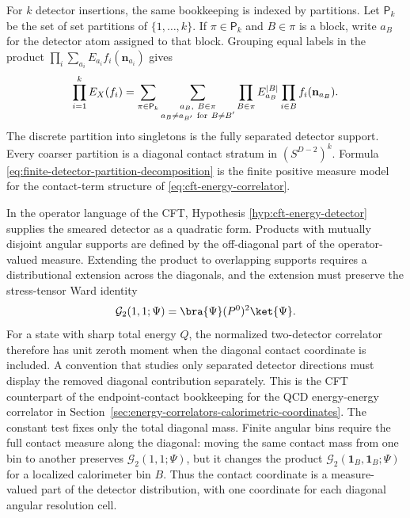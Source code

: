 For \(k\) detector insertions, the same bookkeeping is indexed by partitions.
Let \(\mathsf P_k\) be the set of set partitions of \(\{1,\ldots,k\}\).  If
\(\pi\in\mathsf P_k\) and \(B\in\pi\) is a block, write \(a_B\) for the
detector atom assigned to that block.  Grouping equal labels in the product
\(\prod_i\sum_{a_i}E_{a_i}f_i(\mathbf n_{a_i})\) gives
\begin{equation}
  \prod_{i=1}^k E_X(f_i)
  =
  \sum_{\pi\in\mathsf P_k}
  \sum_{\substack{a_B,\ B\in\pi\\ a_B\neq a_{B'}\ {\rm for}\ B\neq B'}}
  \prod_{B\in\pi}
  E_{a_B}^{|B|}
  \prod_{i\in B} f_i(\mathbf n_{a_B}).
  \label{eq:finite-detector-partition-decomposition}
\end{equation}
The discrete partition into singletons is the fully separated detector
support.  Every coarser partition is a diagonal contact stratum in
\((S^{D-2})^k\).  Formula
\eqref{eq:finite-detector-partition-decomposition} is the finite positive
measure model for the contact-term structure of
\eqref{eq:cft-energy-correlator}.

In the operator language of the CFT, Hypothesis
\ref{hyp:cft-energy-detector} supplies the smeared detector as a quadratic
form.  Products with mutually disjoint angular supports are defined by the
off-diagonal part of the operator-valued measure.  Extending the product to
overlapping supports requires a distributional extension across the
diagonals, and the extension must preserve the stress-tensor Ward identity
\begin{equation}
  \mathcal G_2(1,1;\Psi)
  =
  \bra{\Psi}(P^0)^2\ket{\Psi}.
  \label{eq:detector-product-total-energy-ward}
\end{equation}
For a state with sharp total energy \(Q\), the normalized two-detector
correlator therefore has unit zeroth moment when the diagonal contact
coordinate is included.  A convention that studies only separated detector
directions must display the removed diagonal contribution separately.  This is
the CFT counterpart of the endpoint-contact bookkeeping for the QCD
energy-energy correlator in
Section~\ref{sec:energy-correlators-calorimetric-coordinates}.
The constant test fixes only the total diagonal mass.  Finite angular bins
require the full contact measure along the diagonal: moving the same contact
mass from one bin to another preserves
\(\mathcal G_2(1,1;\Psi)\), but it changes the product
\(\mathcal G_2(\mathbf 1_B,\mathbf 1_B;\Psi)\) for a localized calorimeter
bin \(B\).  Thus the contact coordinate is a measure-valued part of the
detector distribution, with one coordinate for each diagonal angular
resolution cell.

